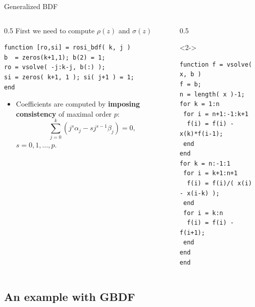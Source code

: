 \documentclass[aspectratio=169,xcolor=dvipsnames]{beamer}
\begin{document}
\begin{frame}[fragile]{Generalized BDF}

\begin{columns}
\begin{column}{0.5\columnwidth}
First we need to compute $\rho(z)$ and $\sigma(z)$
\begin{verbatim}
function [ro,si] = rosi_bdf( k, j )
b  = zeros(k+1,1); b(2) = 1;
ro = vsolve( -j:k-j, b(:) );
si = zeros( k+1, 1 ); si( j+1 ) = 1;
end
\end{verbatim}
\vspace{-2em}\begin{itemize}
	\item[\faWrench] Coefficients are computed by \textbf{imposing consistency} of maximal order $p$:
	\[
	\sum_{j=0}^k(j^s \alpha_j - s j^{s-1} \beta_{j}) = 0,
	\]
	$s = 0,1,\ldots,p$.
\end{itemize}
\end{column}
\begin{column}{0.5\columnwidth}
\begin{onlyenv}<2->
\vspace{-1em}
\begin{verbatim}
function f = vsolve( x, b )
f = b;
n = length( x )-1;
for k = 1:n
 for i = n+1:-1:k+1
  f(i) = f(i) - x(k)*f(i-1);
 end
end
for k = n:-1:1
 for i = k+1:n+1
  f(i) = f(i)/( x(i) - x(i-k) );
 end
 for i = k:n
  f(i) = f(i) - f(i+1);
 end
end
end
\end{verbatim}
\end{onlyenv}
\end{column}
\end{columns}

\end{frame}

\subsection{An example with GBDF}
\end{document}
